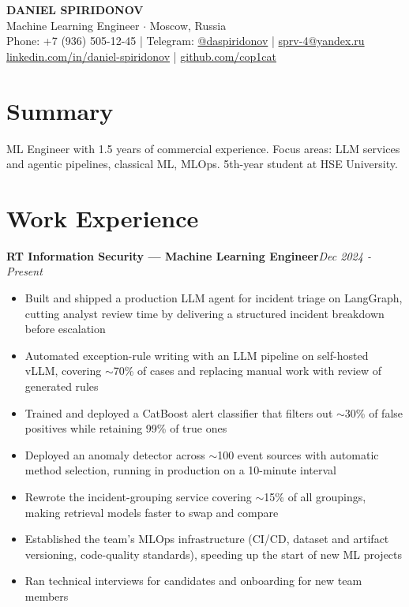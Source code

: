 \documentclass[a4paper,11pt]{article}
\begin{document}
\pagestyle{empty}

\begin{center}
{\huge \textbf{DANIEL SPIRIDONOV}}\\[4pt]
Machine Learning Engineer $\cdot$ Moscow, Russia\\[2pt]
Phone: +7 (936) 505-12-45 | Telegram: \href{https://t.me/daspiridonov}{@daspiridonov} | \href{mailto:sprv-4@yandex.ru}{sprv-4@yandex.ru}\\
\href{https://www.linkedin.com/in/daniel-spiridonov/}{linkedin.com/in/daniel-spiridonov} | \href{https://github.com/cop1cat}{github.com/cop1cat}
\end{center}

\section*{Summary}
ML Engineer with 1.5 years of commercial experience. Focus areas: LLM services and agentic pipelines, classical ML, MLOps. 5th-year student at HSE University.

\section*{Work Experience}
\textbf{RT Information Security --- Machine Learning Engineer}\hfill \textit{Dec 2024 - Present}

\begin{itemize}
  \item Built and shipped a production LLM agent for incident triage on LangGraph, cutting analyst review time by delivering a structured incident breakdown before escalation
  \item Automated exception-rule writing with an LLM pipeline on self-hosted vLLM, covering \(\sim\)70\% of cases and replacing manual work with review of generated rules
  \item Trained and deployed a CatBoost alert classifier that filters out \(\sim\)30\% of false positives while retaining 99\% of true ones
  \item Deployed an anomaly detector across \(\sim\)100 event sources with automatic method selection, running in production on a 10-minute interval
  \item Rewrote the incident-grouping service covering \(\sim\)15\% of all groupings, making retrieval models faster to swap and compare
  \item Established the team's MLOps infrastructure (CI/CD, dataset and artifact versioning, code-quality standards), speeding up the start of new ML projects
  \item Ran technical interviews for candidates and onboarding for new team members
\end{itemize}
\end{document}
